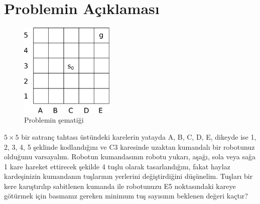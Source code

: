 \vspace{-1mm}
\section{Problemin A\c{c}{\i}klamas{\i}}
%
\begin{figure} %
    \vspace{-5mm}
    \centering
    \includegraphics[width=0.4\textwidth]{./figures/drawing.eps}
    \caption{Problemin \c{s}emati\u{g}i}
    \label{fig:schematic}
    \vspace{-3mm}
\end{figure}
%
$5 \times 5$ bir satran\c{c} tahtas{\i} \"{u}st\"{u}ndeki karelerin yatayda A,
B, C, D, E, dikeyde ise 1, 2, 3, 4, 5 \c{s}eklinde kodland{\i}\u{g}{\i}n{\i} ve
C3 karesinde uzaktan kumandal{\i} bir robotunuz oldu\u{g}unu varsayal{\i}m.
Robotun kumandas{\i}n{\i}n robotu yukar{\i}, a\c{s}a\u{g}{\i}, sola veya
sa\u{g}a 1 kare hareket ettirecek \c{s}ekilde 4 tu\c{s}lu olarak
tasarland{\i}\u{g}{\i}n{\i}, fakat haylaz karde\c{s}inizin kumandan{\i}n
tu\c{s}lar{\i}n{\i}n yerlerini de\u{g}i\c{s}tirdi\u{g}ini d\"{u}\c{s}\"{u}nelim.
Tu\c{s}lar{\i} bir kere kar{\i}\c{s}t{\i}r{\i}l{\i}p sabitlenen kumanda ile
robotunuzu E5 noktas{\i}ndaki kareye g\"{o}t\"{u}rmek i\c{c}in basman{\i}z
gereken minimum tu\c{s} say{\i}s{\i}n{\i}n beklenen de\u{g}eri ka\c{c}t{\i}r?
